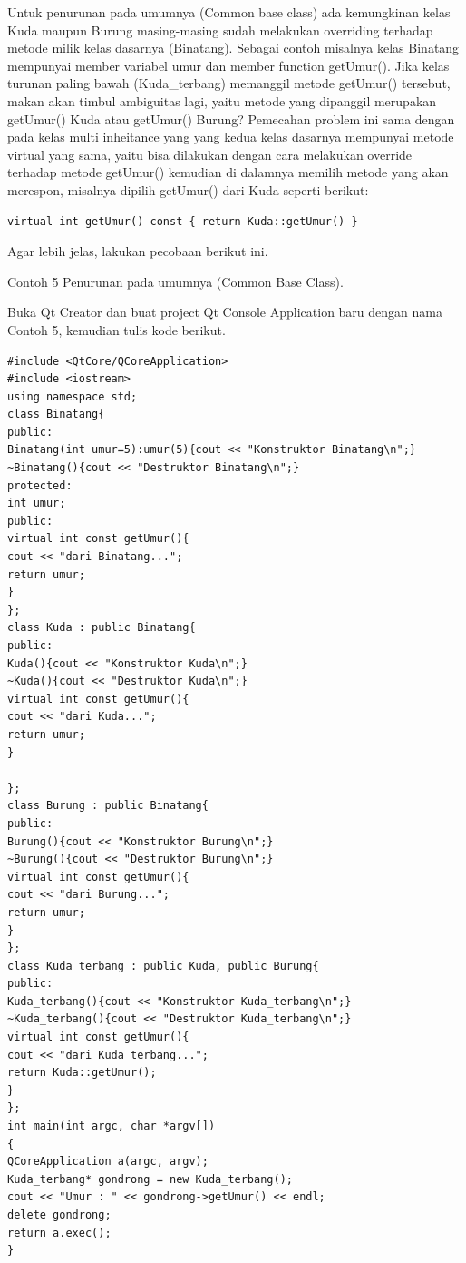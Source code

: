 Untuk penurunan pada umumnya (Common base class) ada kemungkinan kelas
Kuda maupun Burung masing-masing sudah melakukan overriding terhadap
metode milik kelas dasarnya (Binatang). Sebagai contoh misalnya kelas
Binatang mempunyai member variabel umur dan member function getUmur().
Jika kelas turunan paling bawah (Kuda\_terbang) memanggil metode
getUmur() tersebut, makan akan timbul ambiguitas lagi, yaitu metode yang
dipanggil merupakan getUmur() Kuda atau getUmur() Burung? Pemecahan
problem ini sama dengan pada kelas multi inheitance yang yang kedua
kelas dasarnya mempunyai metode virtual yang sama, yaitu bisa dilakukan
dengan cara melakukan override terhadap metode getUmur() kemudian di
dalamnya memilih metode yang akan merespon, misalnya dipilih getUmur()
dari Kuda seperti berikut:

\begin{verbatim}
virtual int getUmur() const { return Kuda::getUmur() }
\end{verbatim}

Agar lebih jelas, lakukan pecobaan berikut ini.

Contoh 5 Penurunan pada umumnya (Common Base Class).

Buka Qt Creator dan buat project Qt Console Application baru dengan nama
Contoh 5, kemudian tulis kode berikut.

\begin{verbatim}
#include <QtCore/QCoreApplication>
#include <iostream>
using namespace std;
class Binatang{
public:
Binatang(int umur=5):umur(5){cout << "Konstruktor Binatang\n";}
~Binatang(){cout << "Destruktor Binatang\n";}
protected:
int umur;
public:
virtual int const getUmur(){
cout << "dari Binatang...";
return umur;
}
};
class Kuda : public Binatang{
public:
Kuda(){cout << "Konstruktor Kuda\n";}
~Kuda(){cout << "Destruktor Kuda\n";}
virtual int const getUmur(){
cout << "dari Kuda...";
return umur;
}
                                        
};
class Burung : public Binatang{
public:
Burung(){cout << "Konstruktor Burung\n";}
~Burung(){cout << "Destruktor Burung\n";}
virtual int const getUmur(){
cout << "dari Burung...";
return umur;
}
};
class Kuda_terbang : public Kuda, public Burung{
public:
Kuda_terbang(){cout << "Konstruktor Kuda_terbang\n";}
~Kuda_terbang(){cout << "Destruktor Kuda_terbang\n";}
virtual int const getUmur(){
cout << "dari Kuda_terbang...";
return Kuda::getUmur();
}
};
int main(int argc, char *argv[])
{
QCoreApplication a(argc, argv);
Kuda_terbang* gondrong = new Kuda_terbang();
cout << "Umur : " << gondrong->getUmur() << endl;
delete gondrong;
return a.exec();
}
\end{verbatim}

